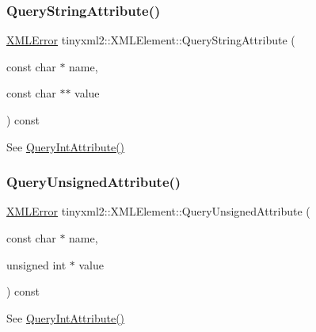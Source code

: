 \subsubsection{\texorpdfstring{Query\+String\+Attribute()}{QueryStringAttribute()}}
{\footnotesize\ttfamily \mbox{\hyperlink{namespacetinyxml2_a1fbf88509c3ac88c09117b1947414e08}{X\+M\+L\+Error}} tinyxml2\+::\+X\+M\+L\+Element\+::\+Query\+String\+Attribute (\begin{DoxyParamCaption}\item[{const char $\ast$}]{name,  }\item[{const char $\ast$$\ast$}]{value }\end{DoxyParamCaption}) const\hspace{0.3cm}{\ttfamily [inline]}}



See \mbox{\hyperlink{classtinyxml2_1_1_x_m_l_element_a8a78bc1187c1c45ad89f2690eab567b1}{Query\+Int\+Attribute()}} 

\mbox{\label{classtinyxml2_1_1_x_m_l_element_a26fc84cbfba6769dafcfbf256c05e22f}} 
\subsubsection{\texorpdfstring{Query\+Unsigned\+Attribute()}{QueryUnsignedAttribute()}}
{\footnotesize\ttfamily \mbox{\hyperlink{namespacetinyxml2_a1fbf88509c3ac88c09117b1947414e08}{X\+M\+L\+Error}} tinyxml2\+::\+X\+M\+L\+Element\+::\+Query\+Unsigned\+Attribute (\begin{DoxyParamCaption}\item[{const char $\ast$}]{name,  }\item[{unsigned int $\ast$}]{value }\end{DoxyParamCaption}) const\hspace{0.3cm}{\ttfamily [inline]}}



See \mbox{\hyperlink{classtinyxml2_1_1_x_m_l_element_a8a78bc1187c1c45ad89f2690eab567b1}{Query\+Int\+Attribute()}} 

\mbox{\label{classtinyxml2_1_1_x_m_l_element_a14d38aa4b5e18a46274a27425188a6a1}} 
